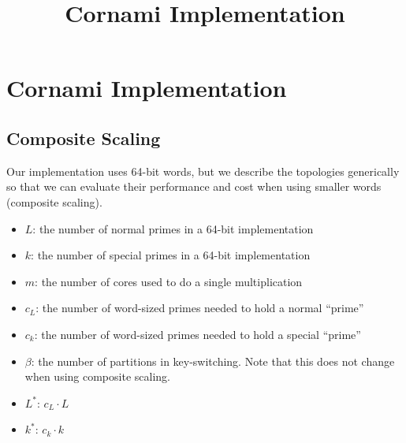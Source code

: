 \documentclass[../../fheimpl.tex]{subfiles}
\begin{document}
	\newif\ifimplismain
	\ifcompileasbook
	\else
	\hypersetup{pageanchor=false}
	\title{Cornami Implementation}
	\implismaintrue
	\maketitle
	\listoffixmes
	\tableofcontents
	\compileasbooktrue
	\hypersetup{pageanchor=true}
	\fi
	
	\section{Cornami Implementation}
	
	\subsection{Composite Scaling}
	Our implementation uses 64-bit words, but we describe the topologies generically so that we can evaluate their performance and cost when using smaller words (composite scaling).
	
	\begin{itemize}
		\item $L$: the number of normal primes in a 64-bit implementation
		\item $k$: the number of special primes in a 64-bit implementation
		\item $m$: the number of cores used to do a single multiplication
		\item $c_L$: the number of \textsf{word}-sized primes needed to hold a normal ``prime''
		\item $c_k$: the number of \textsf{word}-sized primes needed to hold a special ``prime''
		\item $\beta$: the number of partitions in key-switching. Note that this does not change when using composite scaling.
		\item $L^*$: $c_L\cdot L$
		\item $k^*$: $c_k\cdot k$
	\end{itemize}
	
\end{document}
